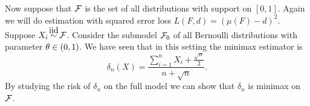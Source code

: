 \begin{ex}
     Now suppose that ${\mathcal{F}}$ is the set of all distributions with support on $[0,1]$. Again we will do estimation with squared error loss $L(F,d) = (\mu(F)-d)^2$. Suppose $X_i \iid \F$. Consider the submodel ${\mathcal{F}}_0$ of all Bernoulli distributions with parameter ${\theta} \in (0,1)$. We have seen that in this setting the minimax estimator is
    \[\delta_n(X) = \frac{\sum_{i=1}^n X_i+\frac{\sqrt{n}}{2}}{n+\sqrt{n}}. \]
    By studying the risk of $\delta_n$ on the full model we can show that $\delta_n$ is minimax on ${\mathcal{F}}$.
\end{ex}
